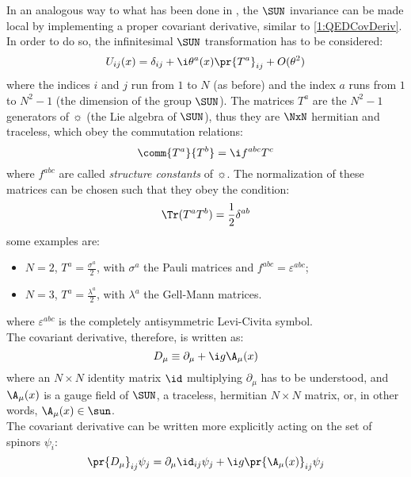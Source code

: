 In an analogous way to what has been done in , the $\SUN$ invariance can be made local by implementing a proper covariant derivative, similar to \eqref{1:QEDCovDeriv}.\\
In order to do so, the infinitesimal $\SUN$ transformation has to be considered:
\begin{equation}
    U_{ij}(x) = \delta_{ij} + \i\theta^a(x)\pr{T^a}_{ij} + O(\theta^2) \label{1:InfinitesimalSUN}
\end{equation}
where the indices $i$ and $j$ run from $1$ to $N$ (as before) and the index $a$ runs from $1$ to $N^2-1$ (the dimension of the group $\SUN$).
The matrices $T^a$ are the $N^2-1$ generators of $\sun$ (the Lie algebra of $\SUN$), thus they are $\NxN$ hermitian and traceless, which obey the commutation relations:
\begin{equation}
    \comm{T^a}{T^b} = \i f^{abc}T^c \label{1:StrConstSUN}
\end{equation}
where $f^{abc}$ are called \emph{structure constants} of $\sun$. The normalization of these matrices can be chosen such that they obey the condition:
\begin{equation}
    \Tr(T^aT^b) = \frac12\delta^{ab} \label{1:NormCondSUN}
\end{equation}
some examples are:
\begin{itemize}
    \item $N=2$, $T^a=\frac{\sigma^a}{2}$, with $\sigma^a$ the Pauli matrices and $f^{abc}=\varepsilon^{abc}$;
    \item $N=3$, $T^a=\frac{\lambda^a}{2}$, with $\lambda^a$ the Gell-Mann matrices.
\end{itemize}
where $\varepsilon^{abc}$ is the completely antisymmetric Levi-Civita symbol.\\
The covariant derivative, therefore, is written as:
\begin{equation}
    D_\mu \equiv \partial_\mu + \i g \A_\mu(x) \label{1:CovDeriv}
\end{equation}
where an $N\times N$ identity matrix $\id$ multiplying $\partial_\mu$ has to be understood, and $\A_\mu(x)$ is a gauge field of $\SUN$, \ie a traceless, hermitian $N\times N$ matrix, or, in other words, $\A_\mu(x)\in\sun$.\\
The covariant derivative can be written more explicitly acting on the set of spinors $\psi_i$:
\begin{equation*}
    \pr{D_\mu}_{ij}\psi_j = \partial_\mu \id_{ij}\psi_j + \i g \pr{\A_\mu(x)}_{ij}\psi_j
\end{equation*}
